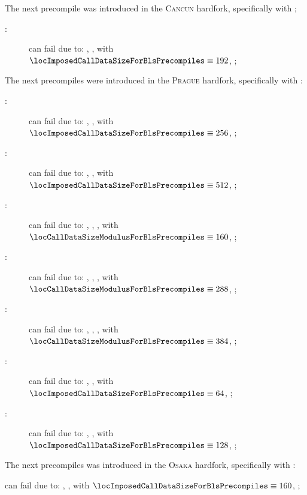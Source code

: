 The next precompile was introduced in the \textsc{Cancun} hardfork, specifically with \cite{EIP-4788};
\begin{description}
	\item[\instPointEvaluation:]
		can fail due to:
		\locBlsPrecompileFailureReasonGas,
		\locBlsPrecompileFailureReasonSize, with $\locImposedCallDataSizeForBlsPrecompiles \equiv 192$,
		\locBlsPrecompileFailureReasonData;
\end{description}
The next precompiles were introduced in the \textsc{Prague} hardfork, specifically with \cite{EIP-2537}:
\begin{description}
	\item[\instBlsGOneAdd{}:]
		can fail due to:
		\locBlsPrecompileFailureReasonGas,
		\locBlsPrecompileFailureReasonSize, with $\locImposedCallDataSizeForBlsPrecompiles \equiv 256$,
		\locBlsPrecompileFailureReasonData;
	\item[\instBlsGTwoAdd{}:]
		can fail due to:
		\locBlsPrecompileFailureReasonGas,
		\locBlsPrecompileFailureReasonSize, with $\locImposedCallDataSizeForBlsPrecompiles \equiv 512$,
		\locBlsPrecompileFailureReasonData;
	\item[\instBlsGOneMsm{}:]
		can fail due to:
		\locBlsPrecompileFailureReasonGas,
		\locBlsPrecompileFailureReasonEmpty,
		\locBlsPrecompileFailureReasonMod, with $\locCallDataSizeModulusForBlsPrecompiles \equiv 160$,
		\locBlsPrecompileFailureReasonData;
	\item[\instBlsGTwoMsm{}:]
		can fail due to:
		\locBlsPrecompileFailureReasonGas,
		\locBlsPrecompileFailureReasonEmpty,
		\locBlsPrecompileFailureReasonMod, with $\locCallDataSizeModulusForBlsPrecompiles \equiv 288$,
		\locBlsPrecompileFailureReasonData;
	\item[\instBlsPairingCheck{}:]
		can fail due to:
		\locBlsPrecompileFailureReasonGas,
		\locBlsPrecompileFailureReasonEmpty,
		\locBlsPrecompileFailureReasonMod, with $\locCallDataSizeModulusForBlsPrecompiles \equiv 384$,
		\locBlsPrecompileFailureReasonData;
	\item[\instBlsMapFpToGOne{}:]
		can fail due to:
		\locBlsPrecompileFailureReasonGas,
		\locBlsPrecompileFailureReasonSize, with $\locImposedCallDataSizeForBlsPrecompiles \equiv 64$,
		\locBlsPrecompileFailureReasonData;
	\item[\instBlsMapFpTwoToGTwo{}:]
		can fail due to:
		\locBlsPrecompileFailureReasonGas,
		\locBlsPrecompileFailureReasonSize, with $\locImposedCallDataSizeForBlsPrecompiles \equiv 128$,
		\locBlsPrecompileFailureReasonData;
\end{description}
The next precompiles was introduced in the \textsc{Osaka} hardfork, specifically with \cite{EIP-7951}:
\item[\instPVerify{}:]
	can fail due to:
	\locBlsPrecompileFailureReasonGas,
	\locBlsPrecompileFailureReasonSize, with $\locImposedCallDataSizeForBlsPrecompiles \equiv 160$,
	\locBlsPrecompileFailureReasonData;

